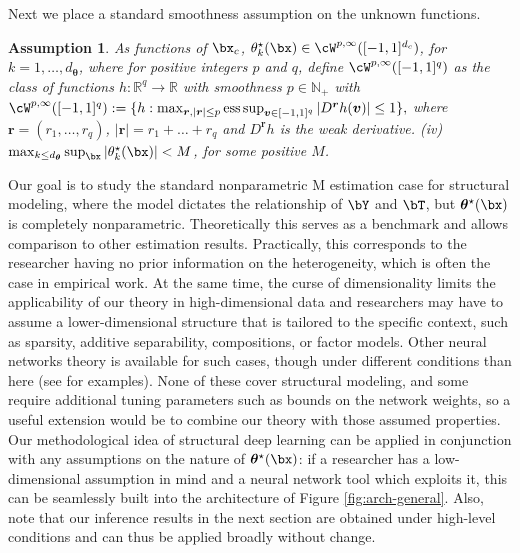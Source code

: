 \documentclass[12pt]{article}
\newtheorem{assumption}{Assumption}
\numberwithin{equation}{section}
\theoremstyle{definition}
\DeclareMathOperator*{\supess}{ess\,sup}
\newcommand{\R}{\mathbb{R}}
\newcommand{\btheta}{\boldsymbol{\theta}}
\newcommand{\ttrue}{\theta^\star}
\newcommand{\bttrue}{\btheta^\star}
\newcommand{\dc}{d_c}  %
\newcommand{\dtheta}{d_{\btheta}}  %
\begin{document}
Next we place a standard smoothness assumption on the unknown functions.
\begin{assumption}
	\label{asmpt:SMOOTH}
	As functions of $\bx_c$, $\ttrue_k(\bx) \in \cW^{p, \infty}([-1, 1]^{\dc})$, for $k=1,\ldots, \dtheta$, where for positive integers $p$ and $q$, define $\cW^{p, \infty}([-1, 1]^q)$ as the class of functions $h: \R^q \to \R$ with smoothness $p \in \mathbb{N}_+$ with
    $
    	\cW^{p, \infty}([-1, 1]^q) := \{ h:  \max_{\bm{r}, |\bm{r}| \leq p} \supess_{\bm{v} \in [-1, 1]^q}  |D^{\bm{r}} h(\bm{v})| \leq 1  \},
    $
    where $\bm{r} = (r_1, \ldots, r_q)$, $|\bm{r}| = r_1 + \ldots + r_q$ and $D^{\bm{r}} h$ is the weak derivative. (iv) $\max_{k \leq \dtheta} \sup_{\bx} |\ttrue_k(\bx)| < M$, for some positive $M$. 
\end{assumption}
Our goal is to study the standard nonparametric M estimation case for structural modeling, where the model dictates the relationship of $\bY$ and $\bT$, but $\bttrue(\bx)$ is completely nonparametric. Theoretically this serves as a benchmark and allows comparison to other estimation results. Practically, this corresponds to the researcher having no prior information on the heterogeneity, which is often the case in empirical work. At the same time, the curse of dimensionality limits the applicability of our theory in high-dimensional data and researchers may have to assume a lower-dimensional structure that is tailored to the specific context, such as sparsity, additive separability, compositions, or factor models. Other neural networks theory is available for such cases, though under different conditions than here (see \cite{Fan-Gu2024_JASA,Fan-Jana-Kulkarni-Yin2025_WP} for examples). None of these cover structural modeling, and some require additional tuning parameters such as bounds on the network weights, so a useful extension would be to combine our theory with those assumed properties. Our methodological idea of structural deep learning can be applied in conjunction with any assumptions on the nature of $\bttrue(\bx)$: if a researcher has a low-dimensional assumption in mind and a neural network tool which exploits it, this can be seamlessly built into the architecture of Figure \ref{fig:arch-general}. Also, note that our inference results in the next section are obtained under high-level conditions and can thus be applied broadly without change. 
\end{document}
